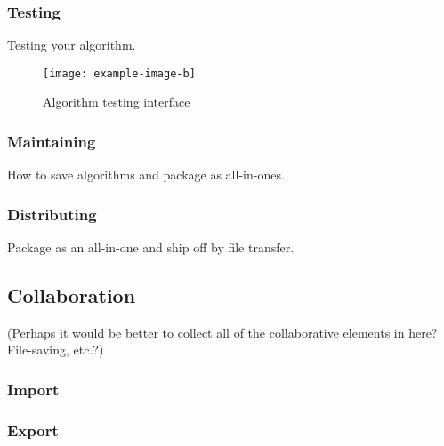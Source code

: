 \subsubsection{Testing}
\begin{draftvspace}{2in}
  Testing your algorithm.
\end{draftvspace}
\begin{figure}
  \centering
  \texttt{[image: example-image-b]}
  \caption{Algorithm testing interface}
  \label{fig:iface:alg-test}
\end{figure}
\subsubsection{Maintaining}
\begin{draftvspace}{3in}
  How to save algorithms and package as all-in-ones.
\end{draftvspace}
\subsubsection{Distributing}
\begin{draftvspace}{1in}
  Package as an all-in-one and ship off by file transfer.
\end{draftvspace}

\subsection{Collaboration}
\label{sec:iface:collab}
(Perhaps it would be better to collect all of the collaborative
elements in here?  File-saving, etc.?)
\subsubsection{Import}
\label{sec:iface:import}
\subsubsection{Export}
\label{sec:iface:export}


